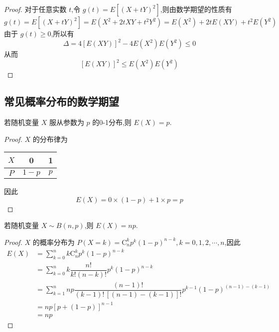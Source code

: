 \begin{proof}
    对于任意实数 $t$,令 $g(t) = E[(X+tY)^2]$,则由数学期望的性质有
    $$
    g(t) = E[(X+tY)^2] = E(X^2 + 2tXY + t^2 Y^2) = E(X^2) + 2tE(XY) + t^2 E(Y^2)
    $$
    由于 $g(t) \geqslant 0$,所以有
    $$
    \varDelta = 4 [E(XY)]^2 - 4 E(X^2) E(Y^2) \leqslant 0
    $$
    从而
    $$
    [E(XY)]^2 \leqslant E(X^2) E(Y^2)
    $$
\end{proof}

\subsection{常见概率分布的数学期望}

\begin{conclusion}
    \indent 若随机变量 $X$ 服从参数为 $p$ 的0-1分布,则 $E(X) = p$.
\end{conclusion}

\begin{proof}
    $X$ 的分布律为

    \begin{center}
        \begin{tabular}{c | c c}
            \hline
            $X$ & 0 & 1 \\
            \hline
            $P$ & $1-p$ & $p$ \\
            \hline
        \end{tabular}
    \end{center}

    因此
    $$
    E(X) = 0 \times (1-p) + 1 \times p = p
    $$
\end{proof}

\begin{conclusion}
    \indent 若随机变量 $X \sim B(n,p)$,则 $E(X) = np$.
\end{conclusion}

\begin{proof}
    $X$ 的概率分布为 $P(X=k) = \mathrm{C}_n^k p^k (1-p)^{n-k}, k=0,1,2,\cdots,n$,因此
    $$
    \begin{aligned}
        E(X) &= \sum_{k=0}^n k \mathrm{C}_n^k p^k (1-p)^{n-k} \\
        &= \sum_{k=0}^n k \dfrac{n!}{k! (n-k)!} p^k (1-p)^{n-k} \\
        &= \sum_{k=1}^n np \dfrac{(n-1)!}{(k-1)! \, [(n-1)-(k-1)]!} p^{k-1} (1-p)^{(n-1)-(k-1)} \\
        &= np[p+(1-p)]^{n-1} \\
        &= np
    \end{aligned}
    $$
\end{proof}

